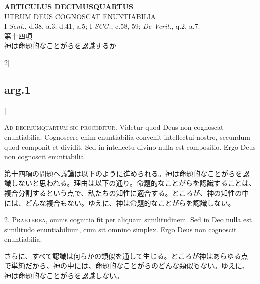 \documentclass[paper=a4paper,fontsize=10pt,jafontsize=9pt,titlepage]{jlreq}
\begin{document}
\newpage



{}
\setcounter{section}{14}
\setcounter{subsection}{0}
\begin{center}
{\Large {\bfseries ARTICULUS DECIMUSQUARTUS}}\\ {\large UTRUM DEUS COGNOSCAT
ENUNTIABILIA}\\ {\footnotesize I {\itshape Sent.}, d.38, a.3; d.41,
a.5; I {\itshape SCG.}, c.58, 59; {\itshape De Verit.}, q.2,
a.7.}\\ {\Large 第十四項\\神は命題的なことがらを認識するか}
\end{center}



\begin{paracol}{2}[\subsection{arg.1}]

{\huge A}{\scshape d decimumquartum sic proceditur}. Videtur quod Deus
non cognoscat enuntiabilia. Cognoscere enim enuntiabilia convenit
intellectui nostro, secundum quod componit et dividit. Sed in
intellectu divino nulla est compositio. Ergo Deus non cognoscit
enuntiabilia.

\switchcolumn

第十四項の問題へ議論は以下のように進められる。神は命題的なことがらを認
識しないと思われる。理由は以下の通り。命題的なことがらを認識することは、
複合分割するという点で、私たちの知性に適合する。ところが、神の知性の中
には、どんな複合もない。ゆえに、神は命題的なことがらを認識しない。


{\scshape 2. Praeterea}, omnis cognitio fit per aliquam
similitudinem. Sed in Deo nulla est similitudo enuntiabilium, cum sit
omnino simplex. Ergo Deus non cognoscit enuntiabilia.

\switchcolumn

さらに、すべて認識は何らかの類似を通して生じる。ところが神はあらゆる点
で単純だから、神の中には、命題的なことがらのどんな類似もない。ゆえに、
神は命題的なことがらを認識しない。

\switchcolumn*[\subsection{s.c.}]


\end{paracol}
\end{document}
